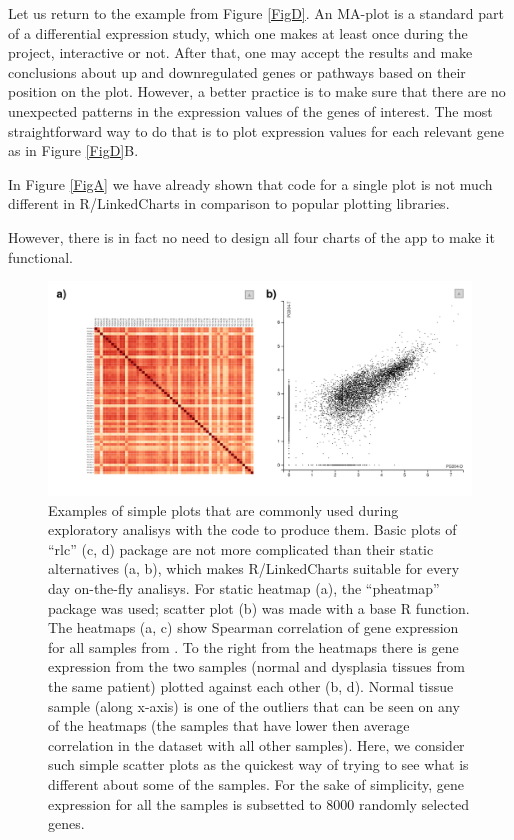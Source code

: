 \documentclass[twocolumn,10pt]{article}
\begin{document}
Let us return to the example from Figure \ref{FigD}. An MA-plot is a standard part of a differential expression study, which one makes at least once during the project, interactive or not. After that, one may accept the results and make conclusions about up and downregulated genes or pathways based on their position on the plot. However, a better practice is to make sure that there are no unexpected patterns in the expression values of the genes of interest. The most straightforward way to do that is to plot expression values for each relevant gene as in Figure \ref{FigD}B. 

In Figure \ref{FigA} we have already shown that code for a single plot is not much different in R/LinkedCharts in comparison to popular plotting libraries. 

 However, there is in fact no need to design all four charts of the app to make it functional.

\begin{figure}
  \includegraphics[width=\textwidth]{FigE/figE.png}
  \caption{Examples of simple plots that are commonly used during exploratory analisys with the code to produce them. Basic plots of ``rlc'' (c, d) package are not more complicated than their static alternatives (a, b), which makes R/LinkedCharts suitable for every day on-the-fly analisys. For static heatmap (a), the ``pheatmap'' package was used; scatter plot (b) was made with a base R function. The heatmaps (a, c) show Spearman correlation of gene expression for all samples from \citet{conway_2015}. To the right from the heatmaps there is gene expression from the two samples (normal and dysplasia tissues from the same patient) plotted against each other (b, d). Normal tissue sample (along x-axis) is one of the outliers that can be seen on any of the heatmaps (the samples that have lower then average correlation in the dataset with all other samples). Here, we consider such simple scatter plots as the quickest way of trying to see what is different about some of the samples. For the sake of simplicity, gene expression for all the samples is subsetted to 8000 randomly selected genes.}
  \label{FigE}
\end{figure}
\end{document}
